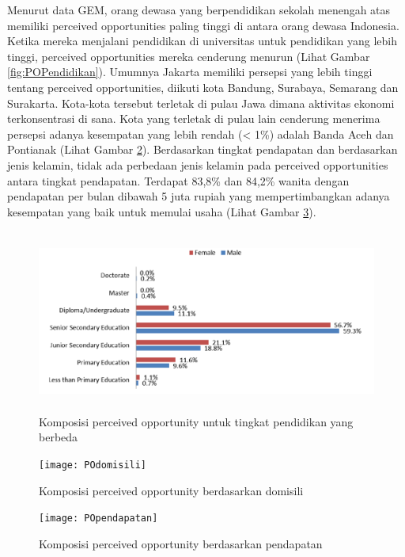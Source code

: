 Menurut data GEM, orang dewasa yang berpendidikan sekolah menengah atas memiliki perceived opportunities paling tinggi di antara orang dewasa Indonesia. Ketika mereka menjalani pendidikan di universitas untuk pendidikan yang lebih tinggi, perceived opportunities mereka cenderung menurun (Lihat Gambar \ref{fig:POPendidikan}). Umumnya Jakarta memiliki persepsi yang lebih tinggi tentang perceived opportunities, diikuti kota Bandung, Surabaya, Semarang dan Surakarta. Kota-kota tersebut terletak di pulau Jawa dimana aktivitas ekonomi terkonsentrasi di sana. Kota yang terletak di pulau lain cenderung menerima persepsi adanya kesempatan yang lebih rendah (< 1\%) adalah Banda Aceh dan Pontianak (Lihat Gambar \ref{fig:POdomisili}). Berdasarkan tingkat pendapatan dan berdasarkan jenis kelamin, tidak ada perbedaan jenis kelamin pada perceived opportunities antara tingkat pendapatan. Terdapat 83,8\% dan 84,2\% wanita dengan pendapatan per bulan dibawah 5 juta rupiah yang mempertimbangkan adanya kesempatan yang baik untuk memulai usaha (Lihat Gambar \ref{fig:POpendapatan}).

\begin{figure} [H]
	\centering  
	\includegraphics[width=14cm, height=6cm]{POPendidikan} 
	\caption[Komposisi perceived opportunity untuk tingkat pendidikan yang berbeda] {Komposisi perceived opportunity untuk tingkat pendidikan yang berbeda} 
	\label{fig:POpendidikan} 
\end{figure}

\begin{figure} [H]
	\centering  
	\texttt{[image: POdomisili]} 
	\caption[Komposisi perceived opportunity berdasarkan domisili]{Komposisi perceived opportunity berdasarkan domisili} 
	\label{fig:POdomisili} 
\end{figure}

\begin{figure} [H]
	\centering  
	\texttt{[image: POpendapatan]} 
	\caption[Komposisi perceived opportunity berdasarkan pendapatan]{Komposisi perceived opportunity berdasarkan pendapatan} 
	\label{fig:POpendapatan} 
\end{figure}


 
